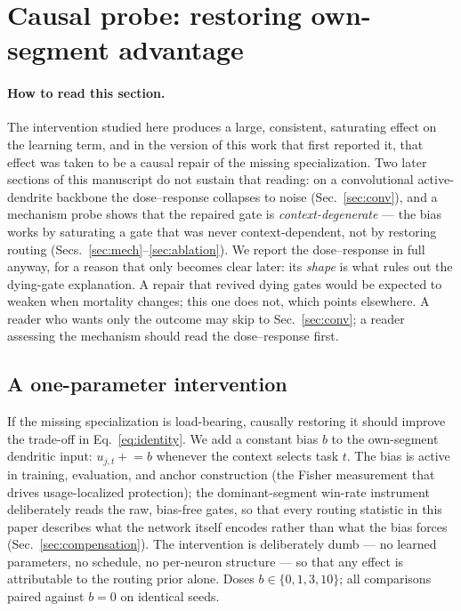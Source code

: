 \documentclass[review,12pt,number]{elsarticle}
\begin{document}


\section{Causal probe: restoring own-segment advantage}
\label{sec:causal}

\paragraph{How to read this section.} The intervention studied here
produces a large, consistent, saturating effect on the learning term, and
in the version of this work that first reported it, that effect was taken
to be a causal repair of the missing specialization. Two later sections
of this manuscript do not sustain that reading: on a convolutional
active-dendrite backbone the dose--response collapses to noise
(Sec.~\ref{sec:conv}), and a mechanism probe shows that the repaired gate
is \emph{context-degenerate} --- the bias works by saturating a gate that
was never context-dependent, not by restoring routing
(Secs.~\ref{sec:mech}--\ref{sec:ablation}). We report the dose--response
in full anyway, for a reason that only becomes clear later: its
\emph{shape} is what rules out the dying-gate explanation. A repair that
revived dying gates would be expected to weaken when mortality changes;
this one does not, which points elsewhere. A reader who wants only the
outcome may skip to Sec.~\ref{sec:conv}; a reader assessing the mechanism
should read the dose--response first.

\subsection{A one-parameter intervention}

If the missing specialization is load-bearing, causally restoring it should
improve the trade-off in Eq.~\eqref{eq:identity}. We add a constant bias $b$
to the own-segment dendritic input: $u_{j,t} \mathrel{+}= b$ whenever the
context selects task $t$. The bias is active in training, evaluation, and
anchor construction (the Fisher measurement that drives usage-localized
protection); the dominant-segment win-rate instrument deliberately reads
the raw, bias-free gates, so that every routing statistic in this paper
describes what the network itself encodes rather than what the bias
forces (Sec.~\ref{sec:compensation}). The intervention is deliberately
dumb --- no learned parameters, no schedule, no per-neuron structure ---
so that any effect is attributable to the routing prior alone. Doses
$b \in \{0, 1, 3, 10\}$; all comparisons paired against $b{=}0$ on
identical seeds.
\end{document}
